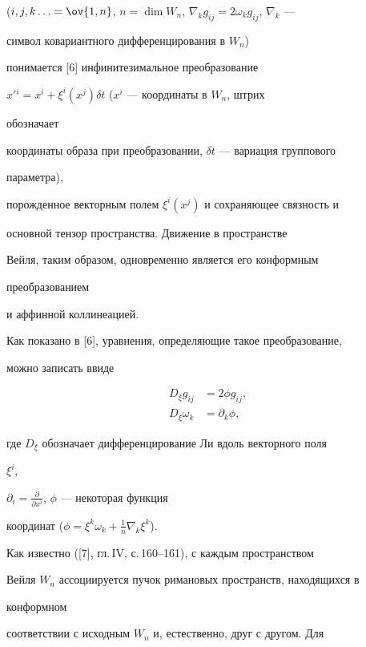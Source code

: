 ($i,j,k\dotsc=\ov{1,n}$, $n=\dim W_n$, $\nabla_k g_{ij}=2\omega_k 


g_{ij}$, $\nabla_k$ --- 


символ ковариантного дифференцирования в $W_n$) 


понимается [6] инфинитезимальное преобразование 


$x'{}^i=x^i+\xi^i(x^j)\delta t$ ($x^i$ --- координаты в $W_n$, штрих 


обозначает 


координаты образа при преобразовании, $\delta t$ --- вариация группового 


параметра), 


порожденное векторным полем $\xi^i(x^j)$ и сохраняющее связность и 


основной тензор пространства. Движение в пространстве 


Вейля, таким образом, одновременно является его конформным 


преобразованием 


и аффинной коллинеацией. 


 


Как показано в [6], уравнения, определяющие такое преобразование, 


можно записать в\linebreak виде 


\begin{align} 


D_\xi g_{ij}&=2\phi g_{ij},\tag{1a} \\


D_\xi \omega_k&=\partial_k\phi,\tag{1b}


\end{align} 


где $D_\xi$ обозначает дифференцирование Ли вдоль векторного поля 


$\xi^i$, 


$\partial_i=\frac{\partial}{\partial x^i}$, $\phi$ --- некоторая функция 


координат ($\phi=\xi^k\omega_k+\frac{1}{n}\nabla_k\xi^k$). 


 


Как известно ([7], гл.\,IV, с.\,160--161), с каждым пространством 


Вейля $W_n$ ассоциируется пучок римановых пространств, находящихся в 


конформном 


соответствии с исходным $W_n$ и, естественно, друг с другом. Для 



